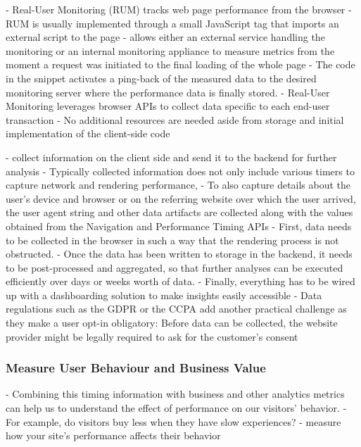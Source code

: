 - Real-User Monitoring (RUM) tracks web page performance from the browser
- RUM is usually implemented through a small JavaScript tag that imports an external script to the page
- allows either an external service handling the monitoring or an internal monitoring appliance to measure metrics from the moment a request was initiated to the final loading of the whole page
- The code in the snippet activates a ping-back of the measured data to the desired monitoring server where the performance data is finally stored.
- Real-User Monitoring leverages browser APIs to collect data specific to each end-user transaction
- No additional resources are needed aside from storage and initial implementation of the client-side code




- collect information on the client side and send it to the backend for further analysis
- Typically collected information does not only include various timers to capture network and rendering performance,
- To also capture details about the user’s device and browser or on the referring website over which the user arrived, the user agent string and other data artifacts are collected along with the values obtained from the Navigation and Performance Timing APIs
- First, data needs to be collected in the browser in such a way that the rendering process is not obstructed. 
- Once the data has been written to storage in the backend, it needs to be post-processed and aggregated, so that further analyses can be executed efficiently over days or weeks worth of data. 
- Finally, everything has to be wired up with a dashboarding solution to make insights easily accessible
- Data regulations such as the GDPR or the CCPA add another practical challenge as they make a user opt-in obligatory: Before data can be collected, the website provider might be legally required to ask for the customer’s consent




\subsubsection{Measure User Behaviour and Business Value}


- Combining this timing information with business and other analytics metrics can help us to understand the effect of performance on our visitors’ behavior. 
- For example, do visitors buy less when they have slow experiences?
- measure how your site’s performance affects their behavior



